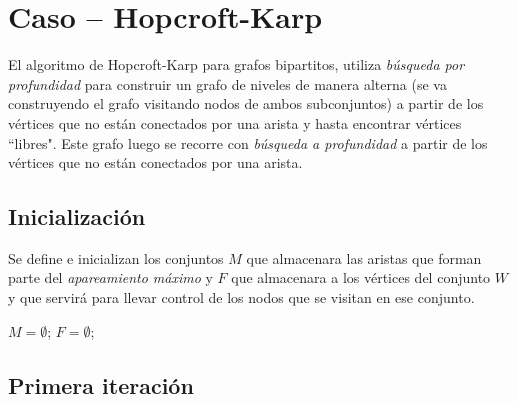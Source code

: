 \documentclass[12pt,a4paper]{article}
\begin{document}
\section{Caso -- Hopcroft-Karp} \noindent
El algoritmo de Hopcroft-Karp para grafos bipartitos, utiliza \textit{búsqueda por profundidad} para construir un grafo de niveles de manera alterna (se va construyendo el grafo visitando nodos de ambos subconjuntos) a partir de los vértices que no están conectados por una arista y hasta encontrar vértices ``libres". Este grafo luego se recorre con \textit{búsqueda a profundidad} a partir de los vértices que no están conectados por una arista.

\subsection{Inicialización}
Se define e inicializan los conjuntos $M$ que almacenara las aristas que forman parte del \textit{apareamiento máximo} y $F$ que almacenara a los vértices del conjunto $W$ y que servirá para llevar control de los nodos que se visitan en ese conjunto.
\begin{center}
$M=\emptyset$; $F=\emptyset$;
\end{center}

\subsection{Primera iteración} \noindent
\end{document}
